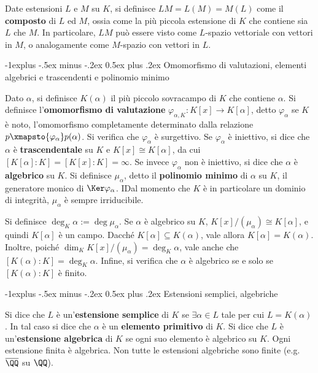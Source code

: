 \documentclass[10pt,landscape]{article}
\makeatletter
\renewcommand{\subsection}{\@startsection{subsection}{2}{0mm}%
	{-1explus -.5ex minus -.2ex}%
	{0.5ex plus .2ex}%
	{\normalfont\normalsize\bfseries}}
\makeatother
\begin{document}
\begin{multicols}{3}
		
		Date estensioni $L$ e $M$ su $K$, si definisce
		$LM = L(M) = M(L)$ come il \textbf{composto} di $L$
		ed $M$, ossia come la più piccola estensione di $K$ che
		contiene sia $L$ che $M$. In particolare, $LM$
		può essere visto come $L$-spazio vettoriale con
		vettori in $M$, o analogamente come $M$-spazio con
		vettori in $L$.
		
		
		\subsection{Omomorfismo di valutazioni, elementi algebrici e trascendenti e polinomio minimo}
		
		
		Dato $\alpha$, si definisce $K(\alpha)$ il più piccolo
		sovracampo di $K$ che contiene $\alpha$. Si definisce l'\textbf{omomorfismo di
		valutazione} $\varphi_{\alpha, K} : K[x] \to K[\alpha]$, detto
		$\varphi_\alpha$ se $K$ è noto, l'omomorfismo completamente
		determinato dalla relazione $p \xmapsto{\varphi_\alpha} p(\alpha)$. Si verifica che $\varphi_\alpha$ è
		surgettivo. Se $\varphi_\alpha$ è iniettivo,
		si dice che $\alpha$ è \textbf{trascendentale} su $K$ e
		$K[x] \cong K[\alpha]$, da cui $[K[\alpha] : K] =
		[K[x] : K] = \infty$. Se invece $\varphi_\alpha$ non
		è iniettivo, si dice che $\alpha$ è \textbf{algebrico}
		su $K$. Si definisce $\mu_\alpha$, detto il \textbf{polinomio
		minimo} di $\alpha$ su $K$, il generatore monico
		di $\Ker \varphi_\alpha$. IDal momento che $K$ è
		in particolare un dominio di integrità, $\mu_\alpha$ è sempre irriducibile. \medskip
		
		
		Si definisce
		$\deg_K \alpha := \deg \mu_\alpha$. Se $\alpha$ è
		algebrico su $K$, $K[x] / (\mu_\alpha) \cong
		K[\alpha]$, e quindi $K[\alpha]$ è un campo. Dacché
		$K[\alpha] \subseteq K(\alpha)$, vale allora
		$K[\alpha] = K(\alpha)$. Inoltre, poiché $\dim_K K[x] / (\mu_\alpha) = \deg_K \alpha$, vale
		anche che $[K(\alpha) : K] = \deg_K \alpha$.
		Infine, si verifica che $\alpha$ è algebrico se e solo se
		$[K(\alpha) : K]$ è finito. \medskip


		\subsection{Estensioni semplici, algebriche}

		
		Si dice che $L$ è un'\textbf{estensione semplice} di
		$K$ se $\exists \alpha \in L$ tale per cui $L = K(\alpha)$.
		In tal caso si dice che $\alpha$ è un \textbf{elemento primitivo} di $K$. Si dice che $L$ è un'\textbf{estensione
		algebrica} di $K$ se ogni suo elemento è algebrico su $K$.
		Ogni estensione finita è algebrica. Non tutte le
		estensioni algebriche sono finite (e.g.~$\overline{\QQ}$ su $\QQ$). \medskip
		

\end{multicols}
\end{document}

